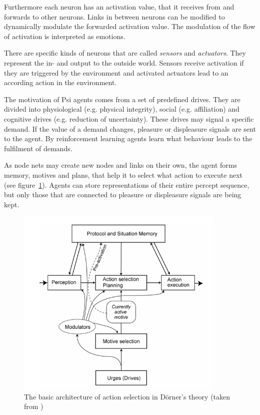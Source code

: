 Furthermore each neuron has an activation value, that it receives from and forwards to other neurons. Links in between neurons can be modified to dynamically modulate the forwarded activation value. The modulation of the flow of activation is interpreted as emotions.

There are specific kinds of neurons that are called \emph{sensors} and \emph{actuators}. They represent the in- and output to the outside world. Sensors receive activation if they are triggered by the environment and activated actuators lead to an according action in the environment.

The motivation of Psi agents comes from a set of predefined drives. They are divided into physiological (e.g. physical integrity), social (e.g. affiliation) and cognitive drives (e.g. reduction of uncertainty). These drives may signal a specific demand. If the value of a demand changes, pleasure or displeasure signals are sent to the agent. By reinforcement learning agents learn what behaviour leads to the fulfilment of demands. 

As node nets may create new nodes and links on their own, the agent forms memory, motives and plans, that help it to select what action to execute next (see figure~\ref{motive_architecture}). Agents can store representations of their entire percept sequence, but only those that are connected to pleasure or displeasure signals are being kept.

\begin{figure}[h]
  \centering
    \includegraphics[width=10cm]{graphics/motive_architecture}
  \caption{The basic architecture of action selection in Dörner's theory (taken from \cite{Bach:2009:PSI:1611304})}
  \label{motive_architecture}
\end{figure}

